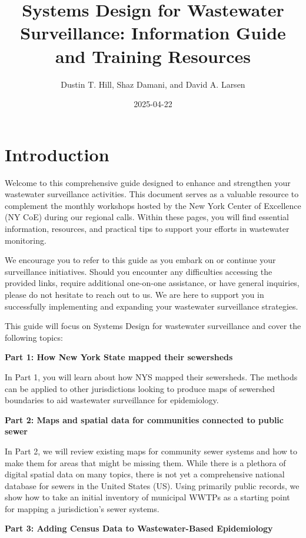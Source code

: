 \documentclass[
]{book}
\title{Systems Design for Wastewater Surveillance: Information Guide and Training Resources}
\author{Dustin T. Hill, Shaz Damani, and David A. Larsen}
\date{2025-04-22}
\begin{document}
\maketitle

{
\setcounter{tocdepth}{1}
\tableofcontents
}
\hypertarget{introduction}{%
\chapter{Introduction}\label{introduction}}

Welcome to this comprehensive guide designed to enhance and strengthen your wastewater surveillance activities. This document serves as a valuable resource to complement the monthly workshops hosted by the New York Center of Excellence (NY CoE) during our regional calls. Within these pages, you will find essential information, resources, and practical tips to support your efforts in wastewater monitoring.

We encourage you to refer to this guide as you embark on or continue your surveillance initiatives. Should you encounter any difficulties accessing the provided links, require additional one-on-one assistance, or have general inquiries, please do not hesitate to reach out to us. We are here to support you in successfully implementing and expanding your wastewater surveillance strategies.

This guide will focus on Systems Design for wastewater surveillance and cover the following topics:

\textbf{Part 1: How New York State mapped their sewersheds}

In Part 1, you will learn about how NYS mapped their sewersheds. The methods can be applied to other jurisdictions looking to produce maps of sewershed boundaries to aid wastewater surveillance for epidemiology.

\textbf{Part 2: Maps and spatial data for communities connected to public sewer}

In Part 2, we will review existing maps for community sewer systems and how to make them for areas that might be missing them. While there is a plethora of digital spatial data on many topics, there is not yet a comprehensive national database for sewers in the United States (US). Using primarily public records, we show how to take an initial inventory of municipal WWTPs as a starting point for mapping a jurisdiction's sewer systems.

\textbf{Part 3: Adding Census Data to Wastewater-Based Epidemiology}
\end{document}

